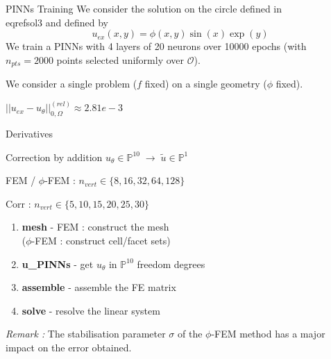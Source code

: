 \begin{frame}{PINNs Training}
    We consider the solution on the circle defined in \\eqref{sol3} and defined by
    \begin{equation*}
        u_{ex}(x,y)=\phi(x,y)\sin(x)\exp(y)
    \end{equation*}
    We train a PINNs with 4 layers of 20 neurons over 10000 epochs (with $n_{pts}=2000$ points selected uniformly over $\mathcal{O}$).

    \centering

    {\selectfont{}\relax} We consider a single problem ($f$ fixed) on a single geometry ($\phi$ fixed).

    \raggedright    
    $||u_{ex}-u_\theta||_{0,\Omega}^{(rel)}\approx 2.81e-3$
\end{frame}

\begin{frame}{Derivatives}
    \; \\
    
    \centering
\end{frame}

\begin{frame}{Correction by addition}
    $u_\theta\in\mathbb{P}^{10} \; \rightarrow \; \tilde{u}\in\mathbb{P}^1$

    \begin{minipage}{0.5\linewidth}
        \centering
    
        \raggedright
        FEM / $\phi$-FEM : $n_{vert}\in\{8,16,32,64,128\}$
        
        Corr : $n_{vert}\in\{5,10,15,20,25,30\}$
    \end{minipage} \quad
    \begin{minipage}{0.46\linewidth}
        \centering

        \small\raggedright
        \begin{enumerate}[\textbullet]
        	\item \textbf{mesh} - FEM : construct the mesh \\
        	($\phi$-FEM : construct cell/facet sets) \\
        	\item \textbf{u\_PINNs} - get $u_\theta$ in $\mathbb{P}^{10}$ freedom degrees \\
        	\item \textbf{assemble} - assemble the FE matrix \\
        	\item \textbf{solve} - resolve the linear system
        \end{enumerate}
    \end{minipage}

    \small
    \textit{Remark :} The stabilisation parameter $\sigma$ of the $\phi$-FEM method has a major impact on the error obtained.
\end{frame}